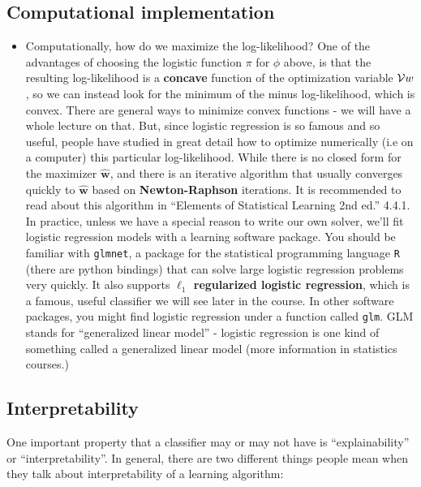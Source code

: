 \documentclass[11pt]{article}
\newcommand{\VV}[1]{\mathbf{#1}}
\begin{document}
  \subsection{Computational implementation}
  \begin{itemize}
  \item
      Computationally, how do we maximize the log-likelihood? One of the
      advantages of choosing the logistic function $\pi$ for $\phi$ above, is
      that the resulting log-likelihood is a {\bf concave} function of the
      optimization variable $\mathcal{V}{w}$, so we can instead look for the minimum of
      the minus log-likelihood, which is convex. There are general ways to
      minimize convex functions - we will have a whole lecture on that. But,
      since logistic regression is so famous and so useful, people have studied
      in great detail how to optimize numerically (i.e on a computer) this
      particular log-likelihood. While there is no closed form for the maximizer
      $\hat{\VV{w}}$,  and there is an iterative algorithm that usually
      converges quickly to $\hat{\VV{w}}$ based on {\bf Newton-Raphson}
      iterations. It is recommended to read about this algorithm in ``Elements
      of Statistical Learning 2nd ed.'' 4.4.1. 
      In practice, unless we have a special reason to write our own solver,
      we'll fit logistic regression models with a learning software package. You should be
      familiar with {\tt glmnet}, a package for the statistical programming
      language {\tt R} (there are python bindings) that can solve large logistic
      regression problems very quickly. It also supports {\bf $\ell_1$ regularized
      logistic regression}, which is a famous, useful 
      classifier we will see later in the course. In other software packages,
      you might find logistic regression under a function called {\tt glm}. GLM
      stands for ``generalized linear model'' - logistic regression is one kind
      of something called a generalized linear model (more information in
      statistics courses.)

\end{itemize}

\subsection{Interpretability}

One important property that a classifier may or may not have is
``explainability'' or ``interpretability''. In general, there are two different things 
people mean when they talk about interpretability of a learning algorithm:
\end{document}
